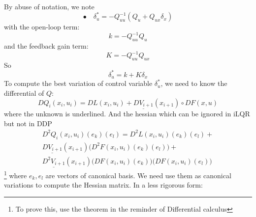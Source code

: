 \documentclass{report}
\begin{document}
By abuse of notation, we note
\begin{equation}
\bullet \quad \delta_u^* = - Q_{uu}^{-1} (Q_u + Q_{ux} \delta_x)
\end{equation}
with the open-loop term:
\begin{equation}
k = - Q_{uu}^{-1} Q_u
\end{equation}
and the feedback gain term:
\begin{equation}
K = - Q_{uu}^{-1} Q_{ux}
\end{equation}
So
\begin{equation}
 \delta_u^* = k + K \delta_x
\end{equation}
To compute the best variation of control variable $\delta_u^*$, we need to know the differential of $Q$:
\begin{equation}
    D Q_i (x_i, u_i) = DL(x_i,u_i) + \underline{DV_{i+1}}(x_{i+1}) \circ DF(x,u)
\end{equation}
where the unknown is underlined. 
And the hessian which can be ignored in iLQR but not in DDP 
\cite{TassaIROS12}
\begin{multline}
     D^2 Q_i (x_i ,u_i) (e_k) (e_l) = D^2 L (x_i ,u_i) (e_k) (e_l) + \\
        \underline{DV_{i+1}}(x_{i+1})\big(D^2 F (x_i ,u_i) (e_k) (e_l)\big) +\\
        \underline{D^2 V_{i+1}}(x_{i+1}) \big( DF(x_i ,u_i)(e_k) \big) \big( DF(x_i ,u_i)(e_l) \big)
\end{multline}
\footnote{To prove this, use the theorem in the reminder of Differential calculus}
where $e_k, e_l$ are vectors of canonical basis. We need use them as canonical variations to compute the Hessian matrix. In a less rigorous form:
\end{document}

